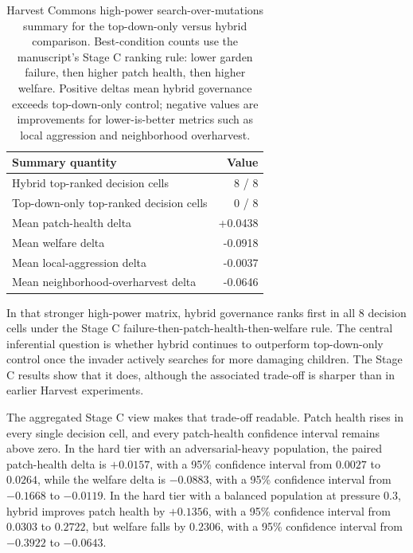 \begin{table}[H]
  \centering
  \captionsetup{font=small}
  \caption{Harvest Commons high-power search-over-mutations summary for the top-down-only versus hybrid comparison. Best-condition counts use the manuscript's Stage C ranking rule: lower garden failure, then higher patch health, then higher welfare. Positive deltas mean hybrid governance exceeds top-down-only control; negative values are improvements for lower-is-better metrics such as local aggression and neighborhood overharvest.}
  \label{tab:study2_summary}
  \small
  \begin{tabular}{lr}
    \toprule
    Summary quantity & Value \\
    \midrule
    Hybrid top-ranked decision cells & 8 / 8 \\
    Top-down-only top-ranked decision cells & 0 / 8 \\
    Mean patch-health delta & +0.0438 \\
    Mean welfare delta & -0.0918 \\
    Mean local-aggression delta & -0.0037 \\
    Mean neighborhood-overharvest delta & -0.0646 \\
    \bottomrule
  \end{tabular}
\end{table}

In that stronger high-power matrix, hybrid governance ranks first in all 8 decision cells under the Stage C failure-then-patch-health-then-welfare rule. The central inferential question is whether hybrid continues to outperform top-down-only control once the invader actively searches for more damaging children. The Stage C results show that it does, although the associated trade-off is sharper than in earlier Harvest experiments.

The aggregated Stage C view makes that trade-off readable. Patch health rises in every single decision cell, and every patch-health confidence interval remains above zero. In the hard tier with an adversarial-heavy population, the paired patch-health delta is \(+0.0157\), with a 95\% confidence interval from \(0.0027\) to \(0.0264\), while the welfare delta is \(-0.0883\), with a 95\% confidence interval from \(-0.1668\) to \(-0.0119\). In the hard tier with a balanced population at pressure 0.3, hybrid improves patch health by \(+0.1356\), with a 95\% confidence interval from \(0.0303\) to \(0.2722\), but welfare falls by \(0.2306\), with a 95\% confidence interval from \(-0.3922\) to \(-0.0643\).

